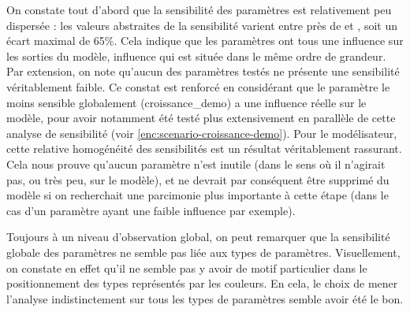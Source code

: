On constate tout d'abord que la sensibilité des paramètres est relativement peu dispersée : les valeurs abstraites de la sensibilité varient entre près de \fg{} et \fg{}, soit un écart maximal de 65\%.
Cela indique que les paramètres ont tous une influence sur les sorties du modèle, influence qui est située dans le même ordre de grandeur.
Par extension, on note qu'aucun des paramètres testés ne présente une sensibilité véritablement faible.
Ce constat est renforcé en considérant que le paramètre le moins sensible globalement (\textsf{croissance\_demo}) a une influence réelle sur le modèle, pour avoir notamment été testé plus extensivement en parallèle de cette analyse de sensibilité (voir \cref{enc:scenario-croissance-demo}).
Pour le modélisateur, cette relative homogénéité des sensibilités est un résultat véritablement rassurant.
Cela nous prouve qu'aucun paramètre n'est inutile (dans le sens où il n'agirait pas, ou très peu, sur le modèle), et ne devrait par conséquent être supprimé du modèle si on recherchait une parcimonie plus importante à cette étape (dans le cas d'un paramètre ayant une faible influence par exemple).

Toujours à un niveau d'observation global, on peut remarquer que la sensibilité globale des paramètres ne semble pas liée aux types de paramètres.
Visuellement, on constate en effet qu'il ne semble pas y avoir de motif particulier dans le positionnement des types représentés par les couleurs.
En cela, le choix de mener l'analyse indistinctement sur tous les types de paramètres semble avoir été le bon.

